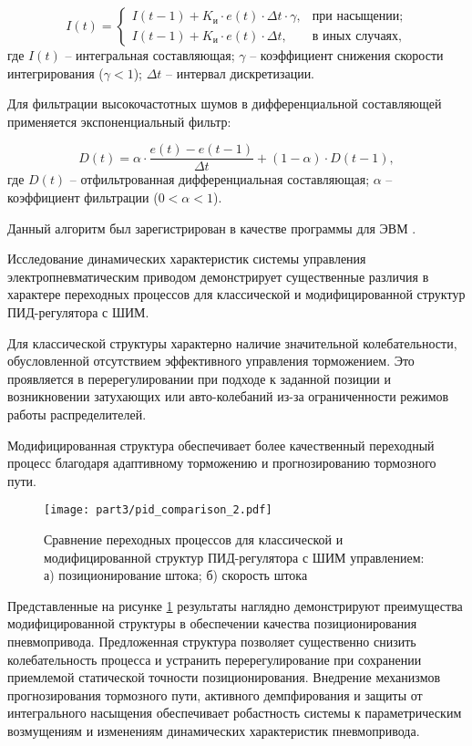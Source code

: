 \begin{equation}\label{eq:anti_windup}
	I(t) = \begin{cases}
		I(t-1) + K_{\text{и}} \cdot e(t) \cdot \Delta t \cdot \gamma, & \text{при насыщении};  \\
		I(t-1) + K_{\text{и}} \cdot e(t) \cdot \Delta t,              & \text{в иных случаях},
	\end{cases}
\end{equation}
где $I(t)$ -- интегральная составляющая;
$\gamma$ -- коэффициент снижения скорости интегрирования ($\gamma < 1$);
$\Delta t$ -- интервал дискретизации.

Для фильтрации высокочастотных шумов в дифференциальной составляющей применяется экспоненциальный фильтр:

\begin{equation}\label{eq:derivative_filter}
	D(t) = \alpha \cdot \frac{e(t) - e(t-1)}{\Delta t} + (1-\alpha) \cdot D(t-1),
\end{equation}
где $D(t)$ -- отфильтрованная дифференциальная составляющая;
$\alpha$ -- коэффициент фильтрации ($0 < \alpha < 1$).

Данный алгоритм был зарегистрирован в качестве программы для ЭВМ \cite{progbib1}.

Исследование динамических характеристик системы управления электропневматическим приводом демонстрирует существенные различия в характере
переходных процессов для классической и модифицированной структур ПИД-регулятора с ШИМ.

Для классической структуры характерно наличие значительной колебательности, обусловленной отсутствием эффективного
управления торможением. Это проявляется в перерегулировании при подходе к заданной позиции и возникновении затухающих или авто-колебаний
из-за ограниченности режимов работы распределителей.

Модифицированная структура обеспечивает более качественный переходный процесс благодаря адаптивному торможению и
прогнозированию тормозного пути.

\begin{figure}
	\centering
	\texttt{[image: part3/pid\_comparison\_2.pdf]}
	\caption{Сравнение переходных процессов для классической и модифицированной структур ПИД-регулятора с ШИМ управлением:\\
		а) позиционирование штока; б) скорость штока}
	\label{fig:ch3:transient_comparison}
\end{figure}

Представленные на рисунке \ref{fig:ch3:transient_comparison} результаты наглядно демонстрируют преимущества
модифицированной структуры в обеспечении качества позиционирования пневмопривода. Предложенная структура
позволяет существенно снизить колебательность процесса и устранить перерегулирование при сохранении приемлемой статической точности позиционирования.
Внедрение механизмов прогнозирования тормозного пути, активного демпфирования и защиты от интегрального насыщения обеспечивает
робастность системы к параметрическим возмущениям и изменениям динамических характеристик пневмопривода.
